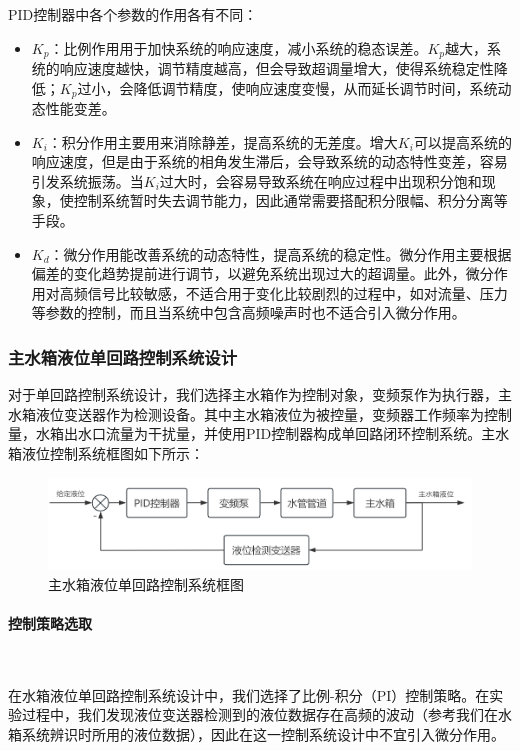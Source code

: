 \documentclass[UTF8]{article}
\begin{document}
PID控制器中各个参数的作用各有不同：
\begin{itemize}
	\item $K_p$：比例作用用于加快系统的响应速度，减小系统的稳态误差。$K_p$越大，系统的响应速度越快，调节精度越高，但会导致超调量增大，使得系统稳定性降低；$K_p$过小，会降低调节精度，使响应速度变慢，从而延长调节时间，系统动态性能变差。
	\item $K_i$：积分作用主要用来消除静差，提高系统的无差度。增大$K_i$可以提高系统的响应速度，但是由于系统的相角发生滞后，会导致系统的动态特性变差，容易引发系统振荡。当$K_i$过大时，会容易导致系统在响应过程中出现积分饱和现象，使控制系统暂时失去调节能力，因此通常需要搭配积分限幅、积分分离等手段。
	\item $K_d$：微分作用能改善系统的动态特性，提高系统的稳定性。微分作用主要根据偏差的变化趋势提前进行调节，以避免系统出现过大的超调量。此外，微分作用对高频信号比较敏感，不适合用于变化比较剧烈的过程中，如对流量、压力等参数的控制，而且当系统中包含高频噪声时也不适合引入微分作用。
\end{itemize}

\subsubsection{主水箱液位单回路控制系统设计}
对于单回路控制系统设计，我们选择主水箱作为控制对象，变频泵作为执行器，主水箱液位变送器作为检测设备。其中主水箱液位为被控量，变频器工作频率为控制量，水箱出水口流量为干扰量，并使用PID控制器构成单回路闭环控制系统。主水箱液位控制系统框图如下所示：
\begin{figure}[H]
    \centering %
    \includegraphics[width=.8\textwidth]{figure/主水箱液位单回路控制系统框图.png} 
    \caption{主水箱液位单回路控制系统框图} %
\end{figure}

\paragraph{控制策略选取}~{}

在水箱液位单回路控制系统设计中，我们选择了比例-积分（PI）控制策略。在实验过程中，我们发现液位变送器检测到的液位数据存在高频的波动（参考我们在水箱系统辨识时所用的液位数据），因此在这一控制系统设计中不宜引入微分作用。
\end{document}
